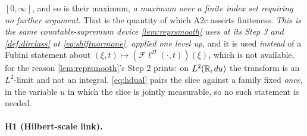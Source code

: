 $[0,\infty]$, and so is their maximum, \emph{a maximum over a finite index set requiring no further
argument}. That is the quantity of which A2c asserts finiteness.
\emph{This is the same countable-supremum device \cref{lem:reprsmooth} uses at its Step 3 and
\cref{def:dirclass} at \eqref{eq:shiftnormone}, applied one level up}, and it is used \emph{instead}
of a Fubini statement about $(\xi,t)\mapsto(\mathcal F\ell^\Pi(\cdot,t))(\xi)$, which is not available,
for the reason \cref{lem:reprsmooth}'s Step 2 prints: on $L^{2}(\mathbb{R},du)$ the transform is an
$L^{2}$-limit and not an integral. \eqref{eq:hdual} pairs the slice against a family fixed \emph{once},
in the variable $u$ in which the slice is jointly measurable, so no such statement is needed.


\paragraph{H1 (Hilbert-scale link).}

